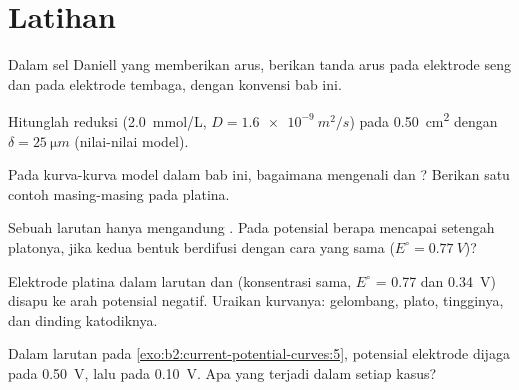 \section{Latihan}

\begin{exercise}[$\star$]\label{exo:b2:current-potential-curves:1}
Dalam sel Daniell yang memberikan arus, berikan tanda arus pada elektrode
seng dan pada elektrode tembaga, dengan konvensi bab ini.
\end{exercise}

\begin{exercise}[$\star$]\label{exo:b2:current-potential-curves:2}
Hitunglah  reduksi  (\qty{2.0}{mmol/L},
$D =
\qty{1.6e-9}{m^2/s}$) pada \qty{0.50}{cm^2} dengan
$\delta = \qty{25}{\micro m}$ (nilai-nilai model).
\end{exercise}

\begin{exercise}[$\star$]\label{exo:b2:current-potential-curves:3}
Pada kurva-kurva model dalam bab ini, bagaimana mengenali  dan
? Berikan satu contoh masing-masing pada platina.
\end{exercise}

\begin{exercise}[$\star$]\label{exo:b2:current-potential-curves:4}
Sebuah larutan hanya mengandung . Pada potensial berapa  mencapai setengah platonya, jika kedua bentuk berdifusi dengan
cara yang sama ($E^\circ = \qty{0.77}{V}$)?
\end{exercise}

\begin{exercise}[$\star\star$]\label{exo:b2:current-potential-curves:5}
Elektrode platina dalam larutan  dan  (konsentrasi
sama, $E^\circ$ = 0.77 dan \qty{0.34}{V}) disapu ke arah potensial negatif.
Uraikan kurvanya: gelombang, plato, tingginya, dan dinding katodiknya.
\end{exercise}

\begin{exercise}[$\star\star$]\label{exo:b2:current-potential-curves:6}
Dalam larutan pada \cref{exo:b2:current-potential-curves:5}, potensial
elektrode dijaga pada \qty{0.50}{V}, lalu pada \qty{0.10}{V}. Apa yang
terjadi dalam setiap kasus?
\end{exercise}

